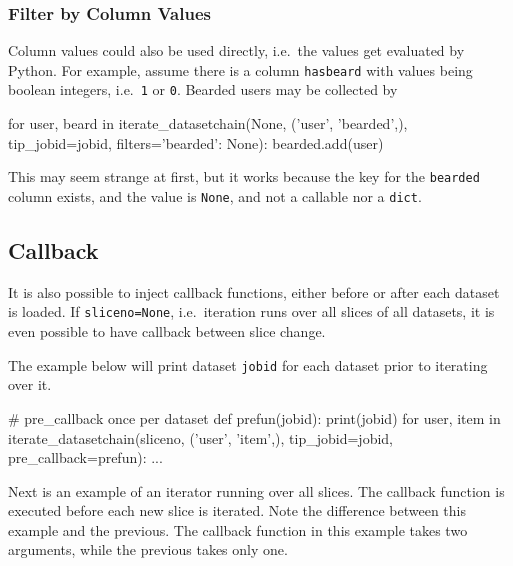 \subsubsection*{Filter by Column Values}


Column values could also be used directly, i.e.\ the values get
evaluated by Python.  For example, assume there is a column
\texttt{hasbeard} with values being boolean integers, i.e.\ \texttt{1}
or \texttt{0}.  Bearded users may be collected by
\begin{python}
for user, beard in iterate_datasetchain(None, ('user', 'bearded',), tip_jobid=jobid,
                                       filters={'bearded': None}):
    bearded.add(user)
\end{python}
This may seem strange at first, but it works because the key
for the \texttt{bearded} column exists, and the value is
\texttt{None}, and not a callable nor a \texttt{dict}.





    


\subsection{Callback}
\label{sec:callback}

It is also possible to inject callback functions, either before or
after each dataset is loaded.  If \texttt{sliceno=None},
i.e.\ iteration runs over all slices of all datasets, it is even
possible to have callback between slice change.

The example below will print dataset \texttt{jobid} for each dataset
prior to iterating over it.
\begin{python}
# pre_callback once per dataset
def prefun(jobid):
    print(jobid)
for user, item in iterate_datasetchain(sliceno, ('user', 'item',), tip_jobid=jobid,
                                       pre_callback=prefun):
    ...
\end{python}
Next is an example of an iterator running over all slices.
The callback function is executed before each new slice is iterated.
Note the difference between this example and the previous.  The
callback function in this example takes two arguments, while the
previous takes only one.

